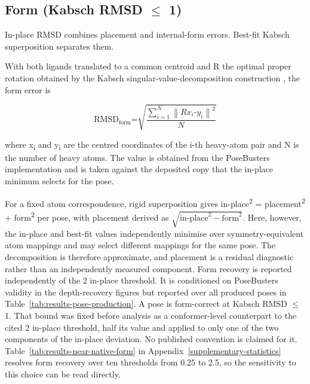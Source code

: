 \hypertarget{form-kabsch-rmsd-1-uxe5}{%
\subsection{\texorpdfstring{Form (Kabsch RMSD \ensuremath{\leq} 1\angstrom{})}{Form (Kabsch RMSD <= 1 Angstrom)}}\label{form-kabsch-rmsd-1-uxe5}}

In-place RMSD combines placement and internal-form errors. Best-fit Kabsch superposition separates them.

With both ligands translated to a common centroid and R the optimal proper rotation obtained by the Kabsch singular-value-decomposition construction \cite{ref062}, the form error is

\[\text{RMSD}_{\text{form}}\text{=}\sqrt{\frac{\sum_{i = 1}^{N}\left\| Rx_{i}\text{-}y_{i} \right\|^{\text{2}}}{N}}\]

where x\textsubscript{i} and y\textsubscript{i} are the centred coordinates of the i-th heavy-atom pair and N is the number of heavy atoms. The value is obtained from the PoseBusters implementation \cite{ref035} and is taken against the deposited copy that the in-place minimum selects for the pose.

For a fixed atom correspondence, rigid superposition gives in-place\textsuperscript{2} = placement\textsuperscript{2} + form\textsuperscript{2} per pose, with placement derived as \(\sqrt{\text{in-place}^{2}-\text{form}^{2}}\). Here, however, the in-place and best-fit values independently minimise over symmetry-equivalent atom mappings and may select different mappings for the same pose. The decomposition is therefore approximate, and placement is a residual diagnostic rather than an independently measured component. Form recovery is reported independently of the 2\angstrom{} in-place threshold. It is conditioned on PoseBusters validity in the depth-recovery figures but reported over all produced poses in Table~\ref{tab:results-pose-production}. A pose is form-correct at Kabsch RMSD \ensuremath{\leq} 1\angstrom{}. That bound was fixed before analysis as a conformer-level counterpart to the cited 2\angstrom{} in-place threshold, half its value and applied to only one of the two components of the in-place deviation. No published convention is claimed for it. Table~\ref{tab:results-near-native-form} in Appendix~\ref{supplementary-statistics} resolves form recovery over ten thresholds from 0.25 to 2.5\angstrom{}, so the sensitivity to this choice can be read directly.

